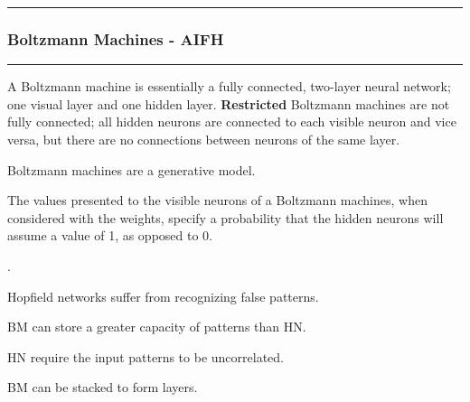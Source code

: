 \documentclass[12pt]{article}
\begin{document}
\myspace
\hrule
\subsubsection{Boltzmann Machines - AIFH}
\hrule

\myspace
\p A Boltzmann machine is essentially a fully connected, two-layer neural network; one visual layer and one hidden layer. \textbf{Restricted} Boltzmann machines are not fully connected; all hidden neurons are connected to each visible neuron and vice versa, but there are no connections between neurons of the same layer. 
\begin{compactitem}
	\item Boltzmann machines are a generative model. 
	\item The values presented to the visible neurons of a Boltzmann machines, when considered with the weights, specify a probability that the hidden neurons will assume a value of 1, as opposed to 0. 
\end{compactitem}


\myspace
\p {}. 
\begin{compactitem}[$\rightarrow$]
	\item Hopfield networks suffer from recognizing false patterns.
	\item BM can store a greater capacity of patterns than HN.
	\item HN require the input patterns to be uncorrelated.
	\item BM can be stacked to form layers.
\end{compactitem}




\end{document}
